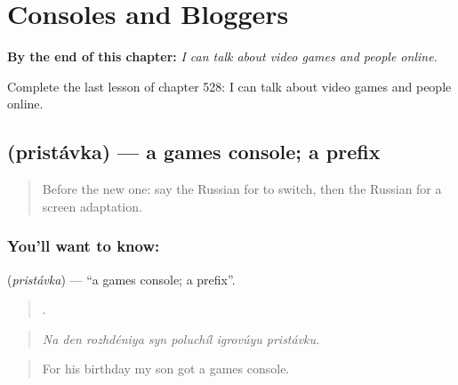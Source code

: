 
\chapter{Consoles and Bloggers}
\label{ch:ru-consoles-and-bloggers}

\begin{chapteropening}
\textbf{By the end of this chapter:} \emph{I can talk about video games and people online.}

Complete the last lesson of chapter 528: I can talk about video games and people online.
\end{chapteropening}

\section[\texorpdfstring{\ru{приставка} (pristávka)}{приставка (pristávka)}]{ (pristávka) — a games console; a prefix}

\label{lesson:RU-C528-pristavka}



\begin{quote}
Before the new one: say the Russian for to switch, then the Russian for a screen adaptation.
\end{quote}

\subsection*{You'll want to know: }
\textbf{} (\emph{pristávka}) — \textquotedblleft{}a games console; a prefix\textquotedblright{}.

\begin{quote}
      .
\end{quote}

\begin{quote}
\emph{Na den rozhdéniya syn poluchíl igrovúyu pristávku.}
\end{quote}

\begin{quote}
For his birthday my son got a games console.
\end{quote}

